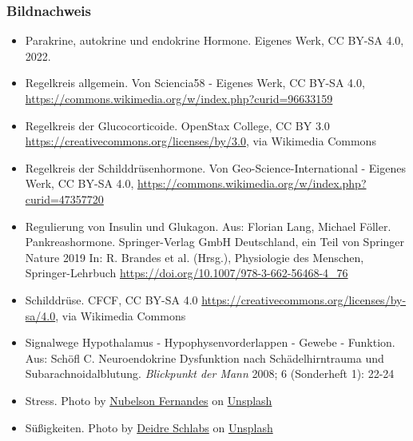 \documentclass{beamer}
\begin{document}
\begin{frame}
\frametitle{Bildnachweis}

\begin{tiny}
\begin{itemize}

\item
Parakrine, autokrine und endokrine Hormone. Eigenes Werk, CC BY-SA 4.0, 2022.

\item
Regelkreis allgemein. Von Sciencia58 - Eigenes Werk, CC BY-SA 4.0, \url{https://commons.wikimedia.org/w/index.php?curid=96633159}


\item
Regelkreis der Glucocorticoide. OpenStax College, CC BY 3.0 \url{https://creativecommons.org/licenses/by/3.0}, via Wikimedia Commons

\item
Regelkreis der Schilddrüsenhormone. Von Geo-Science-International - Eigenes Werk, CC BY-SA 4.0, \url{https://commons.wikimedia.org/w/index.php?curid=47357720}



\item
Regulierung von Insulin und Glukagon. Aus: Florian Lang, Michael Föller. Pankreashormone. Springer-Verlag GmbH Deutschland, ein Teil von Springer Nature 2019 In: R. Brandes et al. (Hrsg.), Physiologie des Menschen, Springer-Lehrbuch \url{https://doi.org/10.1007/978-3-662-56468-4_76}


\item
Schilddrüse. CFCF, CC BY-SA 4.0 \url{https://creativecommons.org/licenses/by-sa/4.0}, via Wikimedia Commons

\item
Signalwege Hypothalamus - Hypophysenvorderlappen - Gewebe - Funktion.  Aus: Schöfl C. Neuroendokrine Dysfunktion nach Schädelhirntrauma und Subarachnoidalblutung. \emph{Blickpunkt der Mann} 2008; 6 (Sonderheft 1): 22-24

\item
Stress. Photo by \href{https://unsplash.com/@nublson?utm_source=unsplash&utm_medium=referral&utm_content=creditCopyText}{Nubelson Fernandes} on \href{https://unsplash.com/s/photos/stress?utm_source=unsplash&utm_medium=referral&utm_content=creditCopyText}{Unsplash}

\item
Sü\ss igkeiten. Photo by \href{https://unsplash.com/es/@fluffmedia?utm_source=unsplash&utm_medium=referral&utm_content=creditCopyText}{Deidre Schlabs} on \href{https://unsplash.com/s/photos/sweets?utm_source=unsplash&utm_medium=referral&utm_content=creditCopyText}{Unsplash}
  


\end{itemize}
\end{tiny}
\end{frame}
\end{document}
